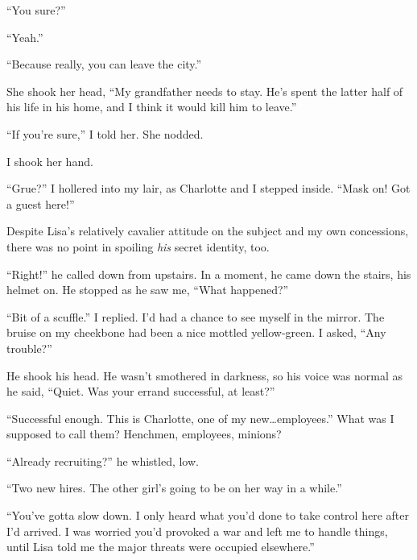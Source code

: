 ``You sure?''



``Yeah.''



``Because really, you can leave the city.''



She shook her head, ``My grandfather needs to stay.  He's spent the latter half of his life in his home, and I think it would kill him to leave.''



``If you're sure,'' I told her.  She nodded.



I shook her hand.



\sectionbreak



``Grue?'' I hollered into my lair, as Charlotte and I stepped inside.  ``Mask on!  Got a guest here!''



Despite Lisa's relatively cavalier attitude on the subject and my own concessions, there was no point in spoiling \emph{his} secret identity, too.



``Right!'' he called down from upstairs.  In a moment, he came down the stairs, his helmet on.  He stopped as he saw me, ``What happened?''



``Bit of a scuffle.''  I replied.  I'd had a chance to see myself in the mirror.  The bruise on my cheekbone had been a nice mottled yellow-green.  I asked, ``Any trouble?''



He shook his head.  He wasn't smothered in darkness, so his voice was normal as he said, ``Quiet.  Was your errand successful, at least?''



``Successful enough.  This is Charlotte, one of my new\ldots employees.'' What was I supposed to call them?  Henchmen, employees, minions?



``Already recruiting?'' he whistled, low.



``Two new hires.  The other girl's going to be on her way in a while.''



``You've gotta slow down.  I only heard what you'd done to take control here after I'd arrived.  I was worried you'd provoked a war and left me to handle things, until Lisa told me the major threats were occupied elsewhere.''



